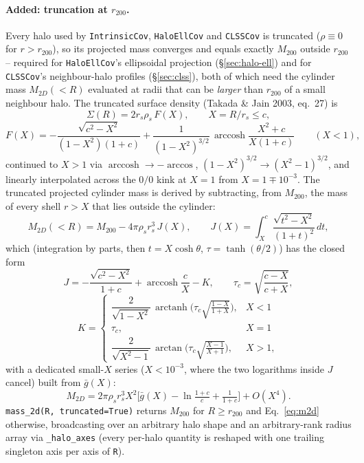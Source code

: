 \documentclass[a4paper, 11pt]{article}
\newcommand{\modname}[1]{\textcolor{kwcol}{\texttt{#1}}}
\begin{document}
\paragraph{Added: truncation at $r_{200}$.} Every halo used by
\modname{IntrinsicCov}, \modname{HaloEllCov} and \modname{CLSSCov} is
truncated ($\rho \equiv 0$ for $r > r_{200}$), so its projected mass
converges and equals exactly $M_{200}$ outside $r_{200}$ -- required
for \modname{HaloEllCov}'s ellipsoidal projection
(\S\ref{sec:halo-ell}) and for \modname{CLSSCov}'s neighbour-halo
profiles (\S\ref{sec:clss}), both of which need the cylinder mass
$M_{2D}(<R)$ evaluated at radii that can be \emph{larger} than
$r_{200}$ of a small neighbour halo. The truncated surface density
(Takada \& Jain 2003, eq.~27) is
\begin{equation}
  \Sigma(R) = 2 r_s \rho_s\, F(X), \qquad X = R/r_s \le c,
\end{equation}
\begin{equation}
  F(X) = -\frac{\sqrt{c^2-X^2}}{(1-X^2)(1+c)}
         + \frac{1}{(1-X^2)^{3/2}}\,
           \operatorname{arccosh}\frac{X^2+c}{X(1+c)} \qquad (X<1),
\end{equation}
continued to $X>1$ via $\operatorname{arccosh}\to-\arccos$,
$(1-X^2)^{3/2}\to(X^2-1)^{3/2}$, and linearly interpolated across the
$0/0$ kink at $X=1$ from $X = 1\mp10^{-3}$. The truncated projected
cylinder mass is derived by subtracting, from $M_{200}$, the mass of
every shell $r>X$ that lies outside the cylinder:
\begin{equation}
\label{eq:m2d}
  M_{2D}(<R) = M_{200} - 4\pi\rho_s r_s^3\, J(X), \qquad
  J(X) = \int_X^c \frac{\sqrt{t^2-X^2}}{(1+t)^2}\,dt,
\end{equation}
which (integration by parts, then $t = X\cosh\theta$, $\tau =
\tanh(\theta/2)$) has the closed form
\begin{equation}
  J = -\frac{\sqrt{c^2-X^2}}{1+c} + \operatorname{arccosh}\frac{c}{X}
      - K, \qquad
  \tau_c = \sqrt{\frac{c-X}{c+X}},
\end{equation}
\begin{equation}
  K = \begin{cases}
     \dfrac{2}{\sqrt{1-X^2}}\,\operatorname{arctanh}\!\Big(\tau_c
        \sqrt{\tfrac{1-X}{1+X}}\Big), & X<1 \\[2mm]
     \tau_c, & X=1 \\[1mm]
     \dfrac{2}{\sqrt{X^2-1}}\,\arctan\!\Big(\tau_c
        \sqrt{\tfrac{X-1}{X+1}}\Big), & X>1,
     \end{cases}
\end{equation}
with a dedicated small-$X$ series ($X<10^{-3}$, where the two
logarithms inside $J$ cancel) built from $\bar g(X)$:
\begin{equation}
  M_{2D} = 2\pi\rho_s r_s^3 X^2\Big[\bar g(X) - \ln\tfrac{1+c}{c}
           + \tfrac{1}{1+c}\Big] + O(X^4).
\end{equation}
\texttt{mass\_2d(R, truncated=True)} returns $M_{200}$ for $R\ge
r_{200}$ and Eq.~\eqref{eq:m2d} otherwise, broadcasting over an
arbitrary halo shape and an arbitrary-rank radius array via
\texttt{\_halo\_axes} (every per-halo quantity is reshaped with one
trailing singleton axis per axis of \texttt{R}).
\end{document}
